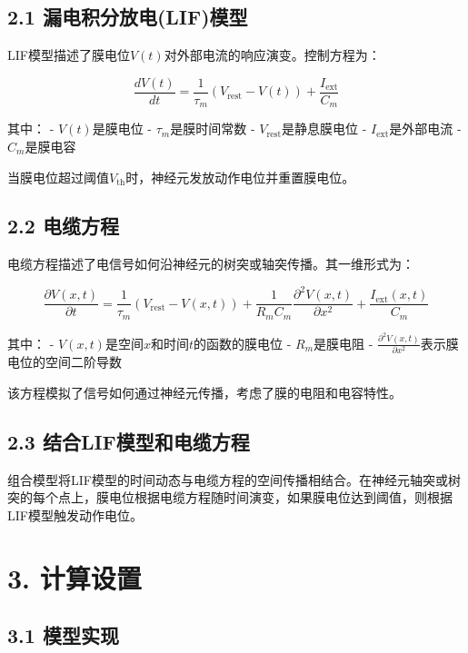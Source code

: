 \documentclass[12pt]{article}
\begin{document}
\subsection*{2.1 漏电积分放电(LIF)模型}

LIF模型描述了膜电位\( V(t) \)对外部电流的响应演变。控制方程为：

\[
\frac{dV(t)}{dt} = \frac{1}{\tau_m} (V_{\text{rest}} - V(t)) + \frac{I_{\text{ext}}}{C_m}
\]

其中：
- \( V(t) \)是膜电位
- \( \tau_m \)是膜时间常数
- \( V_{\text{rest}} \)是静息膜电位
- \( I_{\text{ext}} \)是外部电流
- \( C_m \)是膜电容

当膜电位超过阈值\( V_{\text{th}} \)时，神经元发放动作电位并重置膜电位。

\subsection*{2.2 电缆方程}

电缆方程描述了电信号如何沿神经元的树突或轴突传播。其一维形式为：

\[
\frac{\partial V(x,t)}{\partial t} = \frac{1}{\tau_m} \left( V_{\text{rest}} - V(x,t) \right) + \frac{1}{R_m C_m} \frac{\partial^2 V(x,t)}{\partial x^2} + \frac{I_{\text{ext}}(x,t)}{C_m}
\]

其中：
- \( V(x,t) \)是空间\( x \)和时间\( t \)的函数的膜电位
- \( R_m \)是膜电阻
- \( \frac{\partial^2 V(x,t)}{\partial x^2} \)表示膜电位的空间二阶导数

该方程模拟了信号如何通过神经元传播，考虑了膜的电阻和电容特性。

\subsection*{2.3 结合LIF模型和电缆方程}

组合模型将LIF模型的时间动态与电缆方程的空间传播相结合。在神经元轴突或树突的每个点上，膜电位根据电缆方程随时间演变，如果膜电位达到阈值，则根据LIF模型触发动作电位。

\section*{3. 计算设置}

\subsection*{3.1 模型实现}
\end{document}
